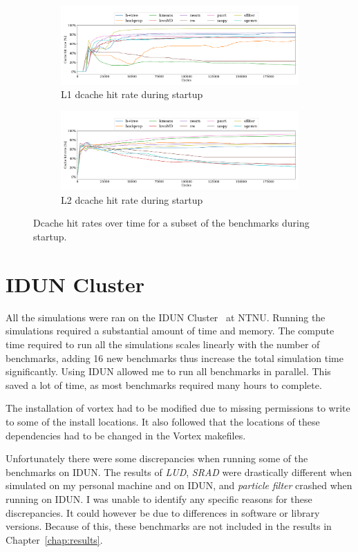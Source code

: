 \begin{figure}
    \centering
    \begin{subfigure}[t]{\textwidth}
        \centering
        \includegraphics[width=\textwidth]{figures/L1cachehit_vlsim.png}
        \caption{L1 dcache hit rate during startup}
        \label{fig:l1_cache_startup_hitrate}
    \end{subfigure}
    \hfill
    \begin{subfigure}[t]{\textwidth}
        \centering
        \includegraphics[width=\textwidth]{figures/L2cachehit_vlsim.png}
        \caption{L2 dcache hit rate during startup}
        \label{fig:l2_cache_startup_hitrate}
    \end{subfigure}
    \caption{Dcache hit rates over time for a subset of the benchmarks during startup.}
    \label{fig:dcache_startup_hitrate}
\end{figure}

\section{IDUN Cluster}

All the simulations were ran on the IDUN Cluster~\cite{Idun_tech_report} at NTNU. Running the simulations required a substantial amount of time and memory. The compute time required to run all the simulations scales linearly with the number of benchmarks, adding 16 new benchmarks thus increase the total simulation time significantly. Using IDUN allowed me to run all benchmarks in parallel. This saved a lot of time, as most benchmarks required many hours to complete.

The installation of \Gls{vortex} had to be modified due to missing permissions to write to some of the install locations. It also followed that the locations of these dependencies had to be changed in the Vortex makefiles.

Unfortunately there were some discrepancies when running some of the benchmarks on IDUN. The results of \textit{LUD}, \textit{SRAD} were drastically different when simulated on my personal machine and on IDUN, and \textit{particle filter} crashed when running on IDUN. I was unable to identify any specific reasons for these discrepancies. It could however be due to differences in software or library versions. Because of this, these benchmarks are not included in the results in Chapter~\ref{chap:results}.